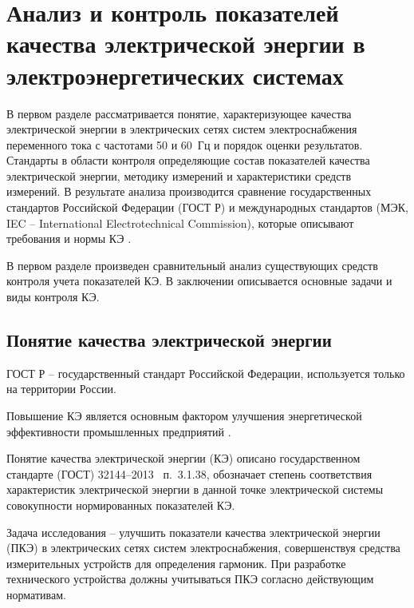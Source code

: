 \chapter{Анализ и контроль показателей качества электрической энергии в электроэнергетических системах}\label{ch:ch1}

В первом разделе рассматривается понятие, характеризующее качества электрической энергии в электрических сетях систем электроснабжения переменного тока с частотами 50 и 60~Гц и порядок оценки результатов. Стандарты в области контроля определяющие состав показателей качества электрической энергии, методику измерений и характеристики средств измерений. В результате анализа производится сравнение государственных стандартов Российской Федерации (ГОСТ Р) и международных стандартов (МЭК, IEC -- International Electrotechnical Commission), которые описывают требования и нормы КЭ \cite{IEC}.

В первом разделе произведен сравнительный анализ существующих средств контроля учета показателей КЭ. В заключении описывается основные задачи и виды контроля КЭ.

\section{Понятие качества электрической энергии}\label{sec:ch1/sec1_1}
ГОСТ Р -- государственный стандарт Российской Федерации, используется только на территории России.

Повышение КЭ является основным фактором улучшения энергетической эффективности промышленных предприятий \cite{закон2009энергосбережении}. 

Понятие качества электрической энергии (КЭ) описано государственном стандарте (ГОСТ) 32144--2013~\cite{ГОСТ32144-2013} п.~3.1.38, обозначает степень соответствия характеристик электрической энергии в данной точке электрической системы совокупности нормированных показателей КЭ.

Задача исследования -- улучшить показатели качества электрической энергии (ПКЭ) в электрических сетях систем электроснабжения, совершенствуя средства измерительных устройств для определения гармоник. При разработке технического устройства должны учитываться ПКЭ  согласно действующим нормативам. 

